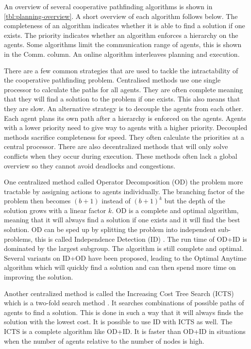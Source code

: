 An overview of several cooperative pathfinding algorithms is shown in
\autoref{tbl:planning-overview}. A short overview of each algorithm follows
below. The completeness of an algorithm indicates whether it is able to find a
solution if one exists. The priority indicates whether an algorithm enforces a
hierarchy on the agents. Some algorithms limit the communication range of
agents, this is shown in the Comm. column. An online algorithm interleaves
planning and execution.

There are a few common strategies that are used to tackle the intractability of
the cooperative pathfinding problem. Centralised methods use one single
processor to calculate the paths for all agents. They are often complete
meaning that they
will find a solution to the problem if one exists. This also means that they
are slow. An alternative strategy is to decouple the agents from each other.
Each agent plans its own path after a hierarchy is enforced on the agents.
Agents with a lower priority need to give way to agents with a higher priority.
Decoupled methods sacrifice completeness for speed. They often calculate the
priorities at a central processor. There are also decentralized methods that
will only solve conflicts when they occur during execution. These methods often
lack a global overview so they cannot avoid deadlocks and congestions.

One centralized method called Operator Decomposition (OD)
\citep{standley2010,standley2011} the problem more tractable by assigning
actions to agents individually. The branching factor of the problem then
becomes $(b+1)$ instead of $(b+1)^k$ but the depth of the solution grows with a
linear factor $k$. OD is a complete and optimal algorithm, meaning that it
will always find a solution if one exists and it will find the best solution.
OD can be sped up by splitting the problem into independent sub-problems, this
is called Independence Detection (ID) \citep{standley2010}. The run time of
OD+ID is dominated by the largest subgroup. The algorithm is still complete and
optimal. Several variants on ID+OD have been proposed, leading to the Optimal
Anytime algorithm \citep{standley2011} which will quickly find a solution and
can then spend more time on improving the solution.

Another centralized method is called the Increasing Cost Tree Search (ICTS)
which is a two-fold search method \citep{sharon2013}. It searches combinations
of possible paths of agents to find a solution. This is done in such a way that
it will always finds the solution with the lowest cost. It is possible to use
ID with ICTS as well. The ICTS is a complete algorithm like OD+ID. It is faster
than OD+ID in situations when the number of agents relative to the number of
nodes is high.

